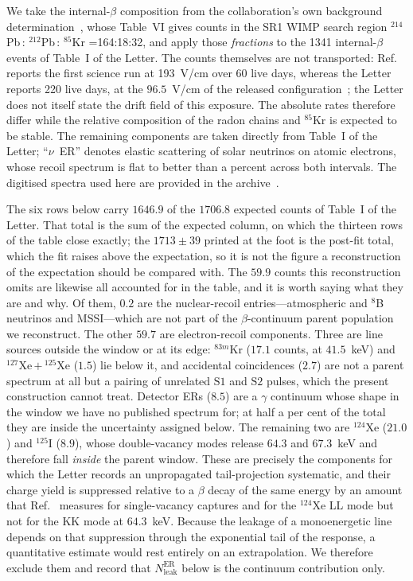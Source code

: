 \documentclass[11pt,a4paper]{article}
\begin{document}
We take the internal-\(\beta\) composition from the collaboration's own
background determination~\cite{Bkg}, whose Table~VI gives counts in the
SR1 WIMP search region \(^{214}\)Pb\(\,:\,^{212}\)Pb\(\,:\,^{85}\)Kr
=164:18:32, and apply those \emph{fractions} to the 1341
internal-\(\beta\) events of Table~I of the Letter. The counts
themselves are not transported: Ref.~\cite{Bkg} reports the first
science run at 193~V/cm over 60 live days, whereas the Letter reports
220 live days, at the \(96.5\)~V/cm of the released
configuration~\cite{Recomb}; the Letter does not itself state the drift
field of this exposure. The absolute rates therefore differ while the
relative composition of the radon chains and \(^{85}\)Kr is expected to
be stable. The remaining components are taken directly from Table~I of
the Letter; ``\(\nu\)~ER'' denotes elastic scattering of solar neutrinos
on atomic electrons, whose recoil spectrum is flat to better than a
percent across both intervals. The digitised spectra used here are
provided in the archive~\cite{Archive}.

The six rows below carry \(1646.9\) of the \(1706.8\) expected counts of
Table~I of the Letter. That total is the sum of the expected column, on
which the thirteen rows of the table close exactly; the \(1713\pm39\)
printed at the foot is the post-fit total, which the fit raises above
the expectation, so it is not the figure a reconstruction of the
expectation should be compared with. The \(59.9\) counts this
reconstruction omits are likewise all accounted for in the table, and it
is worth saying what they are and why. Of them, \(0.2\) are the
nuclear-recoil entries---atmospheric and \(^{8}\)B neutrinos and
MSSI---which are not part of the \(\beta\)-continuum parent population
we reconstruct. The other \(59.7\) are electron-recoil components. Three
are line sources outside the window or at its edge: \(^{83m}\)Kr
(\(17.1\) counts, at \(41.5\)~keV) and \(^{127}\)Xe\,\(+\,^{125}\)Xe
(\(1.5\)) lie below it, and accidental coincidences (\(2.7\)) are not a
parent spectrum at all but a pairing of unrelated \(\mathrm{S1}\) and
\(\mathrm{S2}\) pulses, which the present construction cannot treat.
Detector ERs (\(8.5\)) are a \(\gamma\) continuum whose shape in the
window we have no published spectrum for; at half a per cent of the
total they are inside the uncertainty assigned below. The remaining two
are \(^{124}\)Xe (\(21.0\)) and \(^{125}\)I (\(8.9\)), whose
double-vacancy modes release \(64.3\) and \(67.3\)~keV and therefore
fall \emph{inside} the parent window. These are precisely the components
for which the Letter records an unpropagated tail-projection systematic,
and their charge yield is suppressed relative to a \(\beta\) decay of
the same energy by an amount that Ref.~\cite{Recomb} measures for
single-vacancy captures and for the \(^{124}\)Xe LL mode but not for the
KK mode at \(64.3\)~keV. Because the leakage of a monoenergetic line
depends on that suppression through the exponential tail of the
response, a quantitative estimate would rest entirely on an
extrapolation. We therefore exclude them and record that
\(N^\mathrm{ER}_\mathrm{leak}\) below is the continuum contribution
only.
\end{document}

